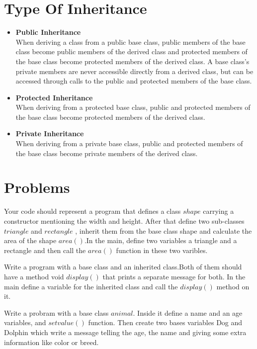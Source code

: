 \documentclass[11pt,fleqn]{book} %
\begin{document}
\section{Type Of Inheritance}
\begin{itemize}
\item \textbf{Public Inheritance} \\
	When deriving a class from a public base class, public members of the base class become public members of the derived class and protected members of the base class become protected members of the derived class. A base class's private members are never accessible directly from a derived class, but can be accessed through calls to the public and protected members of the base class.\\
\item \textbf{Protected Inheritance} \\
	When deriving from a protected base class, public and protected members of the base class become protected members of the derived class.\\
\item \textbf{Private Inheritance} \\
	When deriving from a private base class, public and protected members of the base class become private members of the derived class. 
\end{itemize}
\newpage
\section{Problems} 
\begin{problem}
Your code should represent a program that defines a class $shape$ carrying a constructor mentioning the width and height. After that define two sub-classes $triangle$ and $rectangle$ , inherit them from the base class shape and calculate the area of the shape $area()$.In the main, define two variables a triangle and a rectangle and then call the $area()$ function in these two varibles.\\
\end{problem}
\begin{problem}
Write a program with a base class and an inherited class.Both of them should have a method void $display()$ that prints a separate message for both. In the main define a variable for the inherited class and call the $display()$ method on it.\\
\end{problem}
\begin{problem}
Write a probram with a base class $animal$. Inside it define a name and an age variables, and $setvalue()$ function. Then create two bases variables Dog and Dolphin which write a message telling the age, the name and giving some extra information like color or breed.
\end{problem}
\end{document}
